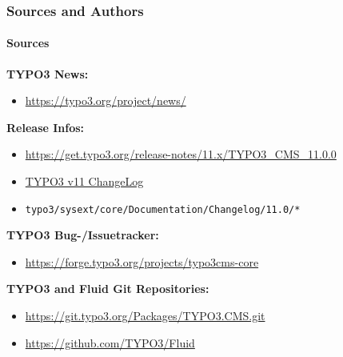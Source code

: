 %

\begin{frame}[fragile]
	\frametitle{Sources and Authors}
	\framesubtitle{Sources}

	\textbf{TYPO3 News:}
		\begin{itemize}\smaller
			\item \url{https://typo3.org/project/news/}
		\end{itemize}

	\textbf{Release Infos:}
		\begin{itemize}\smaller
			\item \url{https://get.typo3.org/release-notes/11.x/TYPO3_CMS_11.0.0}
			\item \href{https://docs.typo3.org/c/typo3/cms-core/master/en-us/Changelog-11.html}{TYPO3 v11 ChangeLog}
			\item \texttt{typo3/sysext/core/Documentation/Changelog/11.0/*}
		\end{itemize}

	\textbf{TYPO3 Bug-/Issuetracker:}
		\begin{itemize}\smaller
			\item \url{https://forge.typo3.org/projects/typo3cms-core}
		\end{itemize}

	\textbf{TYPO3 and Fluid Git Repositories:}
		\begin{itemize}\smaller
			\item \url{https://git.typo3.org/Packages/TYPO3.CMS.git}
			\item \url{https://github.com/TYPO3/Fluid}
		\end{itemize}

\end{frame}

